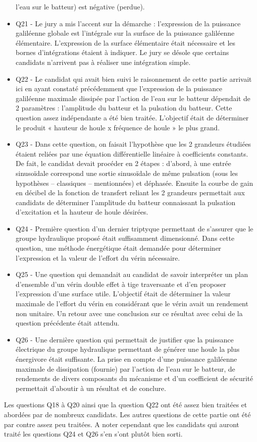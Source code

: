 \documentclass[10pt,fleqn]{article} %
\begin{document}
\begin{itemize}
l’eau sur le batteur) est négative (perdue).
\item Q21 - Le jury a mis l’accent sur la démarche : l’expression de la puissance galiléenne globale est
l’intégrale sur la surface de la puissance galiléenne élémentaire. L’expression de la surface élémentaire
était nécessaire et les bornes d’intégrations étaient à indiquer. Le jury se désole que certains candidats
n’arrivent pas à réaliser une intégration simple.
\item Q22 - Le candidat qui avait bien suivi le raisonnement de cette partie arrivait ici en ayant constaté
précédemment que l’expression de la puissance galiléenne maximale dissipée par l’action de l’eau sur le
batteur dépendait de 2 paramètres : l’amplitude du batteur et la pulsation du batteur. Cette question
assez indépendante a été bien traitée. L’objectif était de déterminer le produit « hauteur de houle x
fréquence de houle » le plus grand.
\item Q23 - Dans cette question, on faisait l’hypothèse que les 2 grandeurs étudiées étaient reliées par
une équation différentielle linéaire à coefficients constants. De fait, le candidat devait procéder en 2
étapes : d’abord, à une entrée sinusoïdale correspond une sortie sinusoïdale de même pulsation (sous
les hypothèses – classiques – mentionnées) et déphasée. Ensuite la courbe de gain en décibel de la
fonction de transfert reliant les 2 grandeurs permettait aux candidats de déterminer l’amplitude du
batteur connaissant la pulsation d’excitation et la hauteur de houle désirées.
\item Q24 - Première question d’un dernier triptyque permettant de s’assurer que le groupe hydraulique
proposé était suffisamment dimensionné. Dans cette question, une méthode énergétique était demandée
pour déterminer l’expression et la valeur de l’effort du vérin nécessaire.
\item Q25 - Une question qui demandait au candidat de savoir interpréter un plan d’ensemble d’un vérin
double effet à tige traversante et d’en proposer l’expression d’une surface utile. L’objectif était de
déterminer la valeur maximale de l’effort du vérin en considérant que le vérin avait un rendement
non unitaire. Un retour avec une conclusion sur ce résultat avec celui de la question précédente était
attendu.
\item Q26 - Une dernière question qui permettait de justifier que la puissance électrique du groupe hydraulique
permettant de générer une houle la plus énergivore était suffisante. La prise en compte d’une puissance
galiléenne maximale de dissipation (fournie) par l’action de l’eau sur le batteur, de rendements de
divers composants du mécanisme et d’un coefficient de sécurité permettait d’aboutir à un résultat et
de conclure.
\end{itemize}

Les questions Q18 à Q20 ainsi que la question Q22 ont été assez bien traitées et abordées par de
nombreux candidats.
Les autres questions de cette partie ont été par contre assez peu traitées. A noter cependant que les
candidats qui auront traité les questions Q24 et Q26 s’en s’ont plutôt bien sorti.





%
\end{document}
